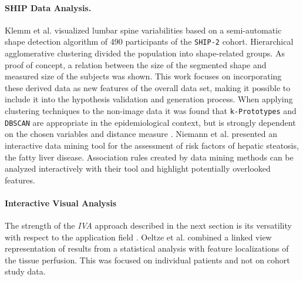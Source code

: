 \documentclass[journal]{style/vgtc} 			          %
\begin{document}
\paragraph{SHIP Data Analysis.}
Klemm et al. \cite{Klemm2013VMV} visualized lumbar spine variabilities based on a semi-automatic shape detection algorithm of 490 participants of the \texttt{SHIP-2} cohort.
%
Hierarchical agglomerative clustering divided the population into shape-related groups.
%
As proof of concept, a relation between the size of the segmented shape and measured size of the subjects was shown.
%
This work focuses on incorporating these derived data as new features of the overall data set, making it possible to include it into the hypothesis validation and generation process.
%
When applying clustering techniques to the non-image data it was found that \texttt{k-Prototypes} and \texttt{DBSCAN} are appropriate in the epidemiological context, but is strongly dependent on the chosen variables and distance measure \cite{Klemm2014BVM}.
%
Niemann et al. \cite{Niemann2014} presented an interactive data mining tool for the assessment of risk factors of hepatic steatosis, the fatty liver disease.
%
Association rules created by data mining methods can be analyzed interactively with their tool and highlight potentially overlooked features.

\paragraph{Interactive Visual Analysis}
The strength of the \emph{IVA} approach described in the next section is its versatility with respect to the application field \cite{Konyha2009}.
%
Oeltze et al. \cite{Oeltze2007} combined a linked view representation of results from a statistical analysis with feature localizations of the tissue perfusion. %
%
This was focused on individual patients and not on cohort study data. 
%
\end{document}

